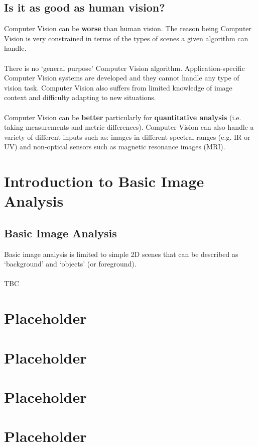 \documentclass{article}
\begin{document}
\subsection{Is it as good as human vision?}
Computer Vision can be \textbf{worse} than human vision. The reason being Computer Vision is very constrained in terms of the types of scenes a given algorithm can handle. 
\\\\
There is no `general purpose' Computer Vision algorithm. Application-specific Computer Vision systems are developed and they cannot handle any type of vision task. Computer Vision also suffers from limited knowledge of image context and difficulty adapting to new situations.
\\\\
Computer Vision can be \textbf{better} particularly for \textbf{quantitative analysis} (i.e. taking measurements and metric differences). Computer Vision can also handle a variety of different inputs such as: images in different spectral ranges (e.g. IR or UV) and non-optical sensors such as magnetic resonance images (MRI).

\newpage
\section{Introduction to Basic Image Analysis}
\subsection{Basic Image Analysis}
Basic image analysis is limited to simple 2D scenes that can be described as `background' and `objects' (or foreground).
\\\\
TBC
\section{Placeholder}


\section{Placeholder}


\section{Placeholder}


\section{Placeholder}
\end{document}
